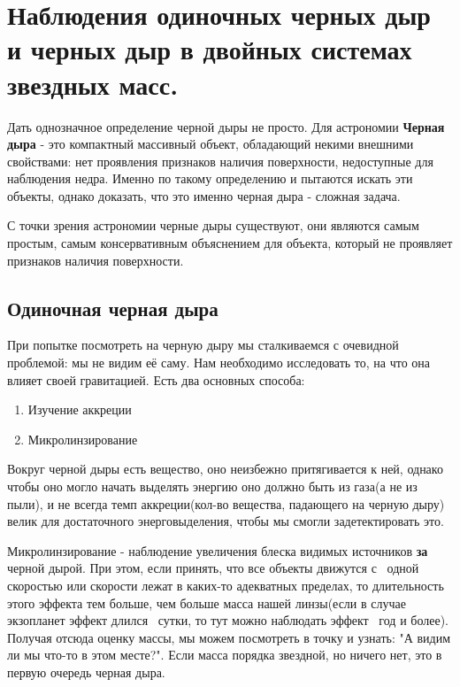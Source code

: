 
\section{ Наблюдения одиночных черных дыр и черных дыр в двойных системах звездных масс.}

Дать однозначное определение черной дыры не просто. Для астрономии \textbf{Черная дыра} - это компактный массивный объект, обладающий некими внешними свойствами: нет проявления признаков наличия поверхности, недоступные для наблюдения недра. Именно по такому определению и пытаются искать эти объекты, однако доказать, что это именно черная дыра - сложная задача.

С точки зрения астрономии черные дыры существуют, они являются самым простым, самым консервативным объяснением для объекта, который не проявляет признаков наличия поверхности.

\subsection{Одиночная черная дыра}

При попытке посмотреть на черную дыру мы сталкиваемся с очевидной проблемой: мы не видим её саму. Нам необходимо исследовать то, на что она влияет своей гравитацией. Есть два основных способа:

\begin{enumerate}
	\item Изучение аккреции
	\item Микролинзирование
\end{enumerate}

Вокруг черной дыры есть вещество, оно неизбежно притягивается к ней, однако чтобы оно могло начать выделять энергию оно должно быть из газа(а не из пыли), и не всегда темп аккреции(кол-во вещества, падающего на черную дыру) велик для достаточного энерговыделения, чтобы мы смогли задетектировать это.

Микролинзирование - наблюдение увеличения блеска видимых источников \textbf{за} черной дырой. При этом, если принять, что все объекты движутся с ~одной скоростью или скорости лежат в каких-то адекватных пределах, то длительность этого эффекта тем больше, чем больше масса нашей линзы(если в случае экзопланет эффект длился ~сутки, то тут можно наблюдать эффект ~год и более). Получая отсюда оценку массы, мы можем посмотреть в точку и узнать: "А видим ли мы что-то в этом месте?". Если масса порядка звездной, но ничего нет, это в первую очередь черная дыра.


